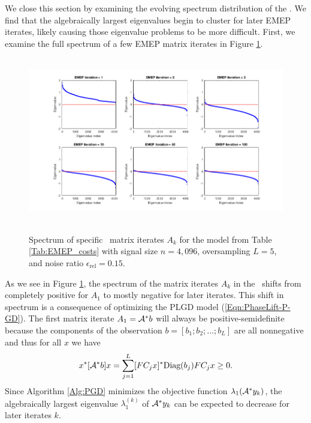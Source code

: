 We close this section by examining the evolving spectrum distribution of the \emep.
We find that the algebraically largest eigenvalues begin to cluster for  later EMEP iterates, likely causing those eigenvalue problems to be more difficult.
First, we examine the full spectrum of a few EMEP matrix iterates in Figure \ref{Fig:EMEP_full_spectrum}.




\begin{figure}[H]
\centering
\hbox{\hspace{-1.2cm} \includegraphics[scale=0.6]{EMEP_full_spectrum} }\vspace{-0.4cm}
	\caption{Spectrum of specific \emep \ matrix iterates $A_k$ for the model from Table \ref{Tab:EMEP_costs} with signal size $n = 4,096$, oversampling $L = 5$, and noise ratio $\epsilon_\text{rel} = 0.15$.}
\label{Fig:EMEP_full_spectrum}
\end{figure}

As we see in Figure \ref{Fig:EMEP_full_spectrum}, the spectrum of the matrix iterates $A_k$ in the \emep \ shifts from completely positive for $A_1$ to mostly negative for later iterates.  This shift in spectrum is a consequence of optimizing the PLGD model (\ref{Eqn:PhaseLift-P-GD}).  The first matrix iterate $A_1 = {\mathcal A}^*b$ will always be positive-semidefinite because the components of the observation $b=[b_1; b_2; \ldots; b_L]$ are all nonnegative and thus for all $x$ we have 
\[
x^*[{\mathcal A}^*b]x 
	= \sum\limits_{\substack{j=1}}^{\substack{L}}
		[FC_jx]^* \textnormal{Diag}(b_j) F C_jx
	\geq 0.
\]
Since Algorithm \ref{Alg:PGD} minimizes the objective function $\lambda_1({\mathcal A}^*y_k)$, the algebraically largest eigenvalue $\lambda_1^{(k)}$ of ${\mathcal A}^*y_k$ can be expected to decrease for later iterates $k$.  


